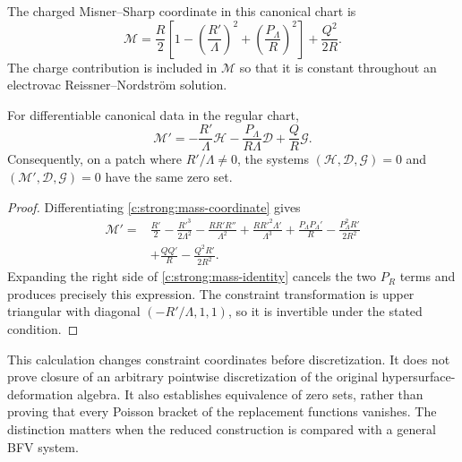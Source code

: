 \begin{definition}
The charged Misner--Sharp coordinate in this canonical chart is
\begin{equation}
 \mathcal M=\frac R2\left[1-\left(\frac{R'}\Lambda\right)^2
                    +\left(\frac{P_\Lambda}R\right)^2\right]
             +\frac{Q^2}{2R}.
\label{c:strong:mass-coordinate}
\end{equation}
The charge contribution is included in $\mathcal M$ so that it is constant throughout an electrovac Reissner--Nordstr\"om solution.
\end{definition}

\begin{proposition}
For differentiable canonical data in the regular chart,
\begin{equation}
 \mathcal M'=-\frac{R'}\Lambda\mathcal H
             -\frac{P_\Lambda}{R\Lambda}\mathcal D
             +\frac QR\mathcal G.
\label{c:strong:mass-identity}
\end{equation}
Consequently, on a patch where $R'/\Lambda\ne0$, the systems
$(\mathcal H,\mathcal D,\mathcal G)=0$ and
$(\mathcal M',\mathcal D,\mathcal G)=0$ have the same zero set.
\end{proposition}
\begin{proof}
Differentiating \eqref{c:strong:mass-coordinate} gives
\begin{equation}
\begin{aligned}
 \mathcal M'={}&\frac{R'}2-\frac{R'^3}{2\Lambda^2}
 -\frac{RR'R''}{\Lambda^2}+\frac{RR'^2\Lambda'}{\Lambda^3}
 +\frac{P_\Lambda P_\Lambda'}R-\frac{P_\Lambda^2R'}{2R^2}\\
 &+\frac{QQ'}R-\frac{Q^2R'}{2R^2}.
\end{aligned}
\end{equation}
Expanding the right side of \eqref{c:strong:mass-identity} cancels the two $P_R$ terms and produces precisely this expression. The constraint transformation is upper triangular with diagonal $(-R'/\Lambda,1,1)$, so it is invertible under the stated condition.
\end{proof}

This calculation changes constraint coordinates before discretization. It does not prove closure of an arbitrary pointwise discretization of the original hypersurface-deformation algebra. It also establishes equivalence of zero sets, rather than proving that every Poisson bracket of the replacement functions vanishes. The distinction matters when the reduced construction is compared with a general BFV system.

